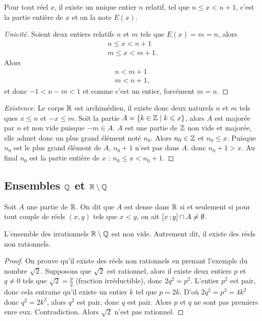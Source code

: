 \begin{prop}
  Pour tout réel \(x\), il existe un unique entier \(n\) relatif, tel que 
  \(n\leqslant x<n + 1\), c'est la partie entière de \(x\) et on la note 
  \(E(x)\).
\end{prop}
\begin{proof}[Unicité]
  Soient deux entiers relatifs \(n\) et \(m\) tels que \(E(x) = m = n\), alors
  \begin{align}
    n\leqslant x< n + 1 \\  m\leqslant x< m + 1.
  \end{align}
  Alors
  \begin{align}
    n<m + 1 \\  m<n + 1,
  \end{align}
  et donc \( - 1<n - m<1\) et comme c'est un entier, forcément \(m = n\).
\end{proof}
\begin{proof}[Existence]
  Le corps \(\mathbb{R}\) est archimédien, il existe donc deux naturels \(n\) et \(m\) 
  tels ques \(x\leqslant n\) et  \( - x\leqslant m\). Soit la partie \(A = 
  \left\{k \in \mathbb{Z}\mathrel{}\middle|\mathrel{}k\leqslant x\right\}\), alors \(A\) est majorée par \(n\) et non 
  vide puisque \( - m\in A\). \(A\) est une partie de \(\mathbb{Z}\) non vide et 
  majorée, elle admet donc un plus grand élément noté \(n_0\). Alors \(n_0\in 
  \mathbb{Z}\) et \(n_0\leqslant x\). Puisque \(n_0\) est le plus grand élément de 
  \(A\), \(n_0 + 1\) n'est pas dans \(A\). donc \(n_0 + 1>x\). Au final \(n_0\) 
  est la partie entière de \(x\) : \(n_0\leqslant x<n_0 + 1\).
\end{proof}

\subsection{Ensembles \(\mathbb{Q}\) et \(\mathbb{R}\setminus\mathbb{Q}\)}

\begin{defdef}[Densité]
  Soit \(A\) une partie de \(\mathbb{R}\). On dit que \(A\) est dense dans \(\mathbb{R}\) si et 
  seulement si pour tout couple de réels \((x, y)\) tels que \(x<y\), on ait 
  \(\left[ x \, ;  y \right]\cap A \neq \emptyset\).
\end{defdef}
\begin{prop}
  L'ensemble des irrationnels \(\mathbb{R}\setminus\mathbb{Q}\) est non vide. Autrement dit, il 
  existe des réels non rationnels.
\end{prop}
\begin{proof}
  On prouve  qu'il existe des réels non rationnels en prenant l'exemple du 
  nombre \(\sqrt{2}\). Supposons que \(\sqrt{2}\) est rationnel, alors il existe 
  deux entiers \(p\) et \(q \neq 0\) tels que \(\sqrt{2} = \frac{p}{q}\) 
  (fraction irréductible), donc \(2q^2 = p^2\). L'entier \(p^2\) est pair, donc 
  cela entraine qu'il existe un entier \(k\) tel que \(p = 2k\). D'où \(2q^2 = 
  p^2 = 4k^2\) donc \(q^2 = 2k^2\), alors \(q^2\) est pair, donc \(q\) est pair.  
  Alors \(p\) et \(q\) ne sont pas premiers enre eux. Contradiction. Alors 
  \(\sqrt{2}\) n'est pas rationnel.
\end{proof}

